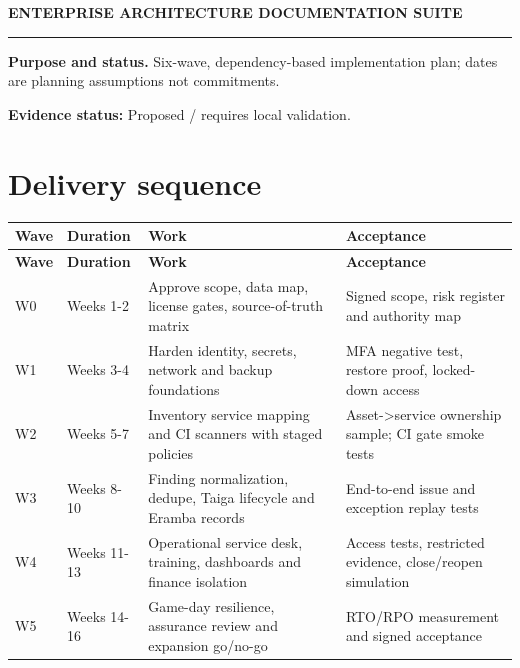 \documentclass[10pt,letterpaper]{article}
\begin{document}
\begin{center}
{\large\bfseries\color{teal} ENTERPRISE ARCHITECTURE DOCUMENTATION SUITE}\par
{}\par
{}\par
\end{center}
\vspace{8pt}\hrule\vspace{12pt}
\textbf{Purpose and status.} Six-wave, dependency-based implementation plan; dates are planning assumptions not commitments.\par
\textbf{Evidence status:} Proposed / requires local validation.\par
\section{Delivery sequence}
\small\begin{longtable}{>{\raggedright\arraybackslash}p{}>{\raggedright\arraybackslash}p{}>{\raggedright\arraybackslash}p{}>{\raggedright\arraybackslash}p{}}
\toprule
\textbf{Wave} & \textbf{Duration} & \textbf{Work} & \textbf{Acceptance}\\
\midrule\endfirsthead
\toprule
\textbf{Wave} & \textbf{Duration} & \textbf{Work} & \textbf{Acceptance}\\
\midrule\endhead
W0 & Weeks 1-2 & Approve scope, data map, license gates, source-of-truth matrix & Signed scope, risk register and authority map\\
W1 & Weeks 3-4 & Harden identity, secrets, network and backup foundations & MFA negative test, restore proof, locked-down access\\
W2 & Weeks 5-7 & Inventory service mapping and CI scanners with staged policies & Asset->service ownership sample; CI gate smoke tests\\
W3 & Weeks 8-10 & Finding normalization, dedupe, Taiga lifecycle and Eramba records & End-to-end issue and exception replay tests\\
W4 & Weeks 11-13 & Operational service desk, training, dashboards and finance isolation & Access tests, restricted evidence, close/reopen simulation\\
W5 & Weeks 14-16 & Game-day resilience, assurance review and expansion go/no-go & RTO/RPO measurement and signed acceptance\\
\bottomrule
\end{longtable}
\normalsize
\end{document}
